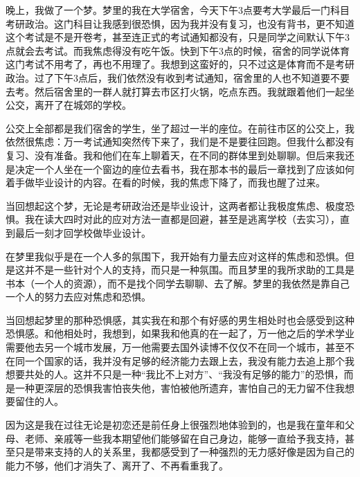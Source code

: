 晚上，我做了一个梦。梦里的我在大学宿舍，今天下午3点要考大学最后一门科目\pozhehao{}考研政治。这门科目让我感到很恐惧，因为我并没有复习，也没有背书，更不知道这个考试是不是开卷考，甚至连正式的考试通知都没有，只是同学之间默认下午3点就会去考试。而我焦虑得没有吃午饭。快到下午3点的时候，宿舍的同学说体育这门考试不用考了，再也不用理了。我想到这蛮好的，只不过这是体育而不是考研政治。过了下午3点后，我们依然没有收到考试通知，宿舍里的人也不知道要不要去考。然后宿舍里的一群人就打算去市区打火锅，吃点东西。我就跟着他们一起坐公交，离开了在城郊的学校。

公交上全部都是我们宿舍的学生，坐了超过一半的座位。在前往市区的公交上，我依然很焦虑：万一考试通知突然传下来了，我们是不是要往回跑。但我什么都没有复习、没有准备。我和他们在车上聊着天，在不同的群体里到处聊聊。但后来我还是决定一个人坐在一个窗边的座位去看书，我在那本书的最后一章找到了应该如何着手做毕业设计的内容。在看的时候，我的焦虑下降了，而我也醒了过来。

当回想起这个梦，无论是考研政治还是毕业设计，这两者都让我极度焦虑、极度恐惧。我在读大四时对此的应对方法一直都是回避，甚至是逃离学校（去实习），直到最后一刻才回学校做毕业设计。

在梦里我似乎是在一个人多的氛围下，我开始有力量去应对这样的焦虑和恐惧。但是这并不是一些针对个人的支持，而只是一种氛围。而且梦里的我所求助的工具是书本（一个人的资源），而不是找个同学去聊聊、去了解。梦里的我依然是靠自己一个人的努力去应对焦虑和恐惧。

当回想起梦里的那种恐惧感，其实我在和那个有好感的男生相处时也会感受到这种恐惧感。和他相处时，我想到，如果我和他真的在一起了，万一他之后的学术学业需要他去另一个城市发展，万一他需要去国外读博\pozhehao{}不仅仅不在同一个城市，甚至不在同一个国家的话，我并没有足够的经济能力去跟上去，我没有能力去追上那个我想要共处的人。这并不只是一种“我比不上对方”、“我没有足够的能力”的恐惧，而是一种更深层的恐惧\pozhehao{}我害怕丧失他，害怕被他所遗弃，害怕自己的无力留不住我想要留住的人。

因为这是我在过往\pozhehao{}无论是初恋还是前任身上\pozhehao{}很强烈地体验到的，也是我在童年和父母、老师、亲戚等一些我本期望他们能够留在自己身边，能够一直给予我支持，甚至只是带来支持的人的关系里，我都感受到了一种强烈的无力感\pozhehao{}好像是因为自己的能力不够，他们才消失了、离开了、不再看重我了。

